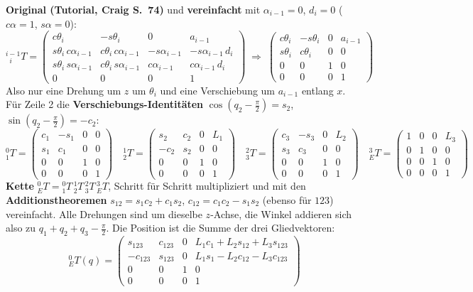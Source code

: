 \documentclass[10pt,a4paper]{article}
\begin{document}
\textbf{Original (Tutorial, Craig S.~74)} und \textbf{vereinfacht} mit $\alpha_{i-1} = 0$, $d_i = 0$
($c\alpha = 1$, $s\alpha = 0$):
\[
  {}^{i-1}_{\;\;i}T =
  \begin{pmatrix}
    c\theta_i & -s\theta_i & 0 & a_{i-1} \\
    s\theta_i\, c\alpha_{i-1} & c\theta_i\, c\alpha_{i-1} & -s\alpha_{i-1} & -s\alpha_{i-1}\, d_i \\
    s\theta_i\, s\alpha_{i-1} & c\theta_i\, s\alpha_{i-1} & c\alpha_{i-1} & c\alpha_{i-1}\, d_i \\
    0 & 0 & 0 & 1
  \end{pmatrix}
  \;\Rightarrow\;
  \begin{pmatrix}
    c\theta_i & -s\theta_i & 0 & a_{i-1} \\
    s\theta_i & c\theta_i & 0 & 0 \\
    0 & 0 & 1 & 0 \\
    0 & 0 & 0 & 1
  \end{pmatrix}
\]
Also nur eine Drehung um $z$ um $\theta_i$ und eine Verschiebung um $a_{i-1}$ entlang $x$. Für Zeile 2 die
\textbf{Verschiebungs-Identitäten} $\cos(q_2 - \frac{\pi}{2}) = s_2$, $\sin(q_2 - \frac{\pi}{2}) = -c_2$:
\[
  {}^0_1T = \begin{pmatrix} c_1 & -s_1 & 0 & 0 \\ s_1 & c_1 & 0 & 0 \\ 0&0&1&0 \\ 0&0&0&1 \end{pmatrix}
  \quad
  {}^1_2T = \begin{pmatrix} s_2 & c_2 & 0 & L_1 \\ -c_2 & s_2 & 0 & 0 \\ 0&0&1&0 \\ 0&0&0&1 \end{pmatrix}
  \quad
  {}^2_3T = \begin{pmatrix} c_3 & -s_3 & 0 & L_2 \\ s_3 & c_3 & 0 & 0 \\ 0&0&1&0 \\ 0&0&0&1 \end{pmatrix}
  \quad
  {}^3_ET = \begin{pmatrix} 1 & 0 & 0 & L_3 \\ 0 & 1 & 0 & 0 \\ 0&0&1&0 \\ 0&0&0&1 \end{pmatrix}
\]
\textbf{Kette} ${}^0_ET = {}^0_1T\,{}^1_2T\,{}^2_3T\,{}^3_ET$, Schritt für Schritt multipliziert und mit den
\textbf{Additionstheoremen} $s_{12} = s_1 c_2 + c_1 s_2$, $c_{12} = c_1 c_2 - s_1 s_2$ (ebenso für $123$) vereinfacht.
Alle Drehungen sind um dieselbe $z$-Achse, die Winkel addieren sich also zu $q_1 + q_2 + q_3 - \frac{\pi}{2}$. Die Position
ist die Summe der drei Gliedvektoren:
\[
  \boxed{
  {}^0_ET(q) =
  \begin{pmatrix}
    s_{123} & c_{123} & 0 & L_1 c_1 + L_2 s_{12} + L_3 s_{123} \\
    -c_{123} & s_{123} & 0 & L_1 s_1 - L_2 c_{12} - L_3 c_{123} \\
    0 & 0 & 1 & 0 \\
    0 & 0 & 0 & 1
  \end{pmatrix}}
\]
\end{document}
